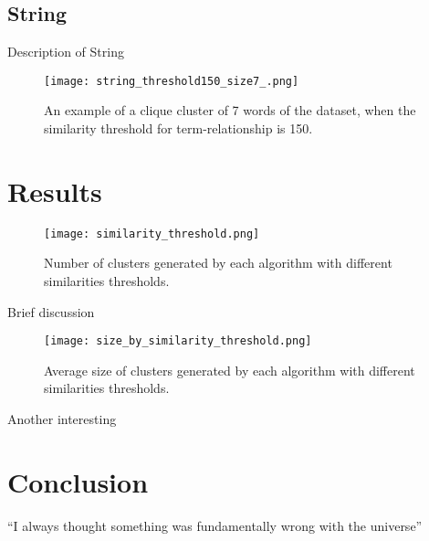 \documentclass{article}
\begin{document}
\subsection{String}
Description of String

\begin{figure}[H]
    \centering
    \texttt{[image: string\_threshold150\_size7\_.png]}
    \caption{An example of a clique cluster of 7 words of the dataset, when the similarity threshold for term-relationship is 150.}
    \label{fig:example_string}
\end{figure}

\section{Results}

\begin{figure}[H]
    \centering
    \texttt{[image: similarity\_threshold.png]}
    \caption{Number of clusters generated by each algorithm with different similarities thresholds.}
    \label{fig:similarity_threshold}
\end{figure}

Brief discussion

\begin{figure}[H]
    \centering
    \texttt{[image: size\_by\_similarity\_threshold.png]}
    \caption{Average size of clusters generated by each algorithm with different similarities thresholds.}
    \label{fig:size_by_similarity_threshold}
\end{figure}

Another interesting 
 
\section{Conclusion}
``I always thought something was fundamentally wrong with the universe'' 



\end{document}
